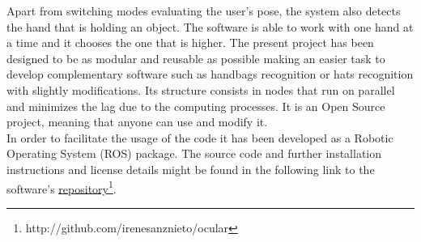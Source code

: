 


Apart from switching modes evaluating the user's pose, the system also detects the hand that is holding an object. 
The software is able to work with one hand at a time and it chooses the one that is higher. 
The present project has been designed to be as modular and reusable as possible making an easier task to develop complementary software such as handbags recognition or hats recognition with slightly modifications. Its structure consists in nodes that run on parallel and minimizes the lag due to the computing processes. It is an Open Source project, meaning that anyone can use and modify it.
\\

In order to facilitate the usage of the code it has been developed as a Robotic Operating System (ROS) \cite{ros} package. The source code and further installation instructions and license details might be found in the following link to the software's \href{http://github.com/irenesanznieto/ocular}{\color{blue}\underline {repository}}\footnote{http://github.com/irenesanznieto/ocular}. 
